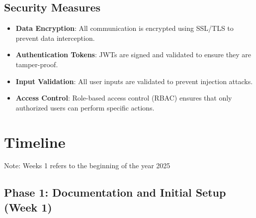 \documentclass[12pt, titlepage]{article}
\begin{document}
\subsection*{Security Measures}
\begin{itemize}
    \item \textbf{Data Encryption}: All communication is encrypted using SSL/TLS to prevent data interception.
    \item \textbf{Authentication Tokens}: JWTs are signed and validated to ensure they are tamper-proof.
    \item \textbf{Input Validation}: All user inputs are validated to prevent injection attacks.
    \item \textbf{Access Control}: Role-based access control (RBAC) ensures that only authorized users can perform specific actions.
\end{itemize}


\section{Timeline}

Note: Weeks 1 refers to the beginning of the year 2025

\subsection*{Phase 1: Documentation and Initial Setup (Week 1)}
\end{document}
